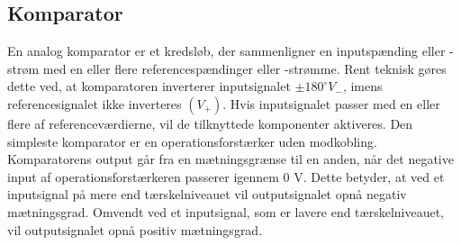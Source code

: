 \subsection{Komparator}\label{Komparatorafsnit}
En analog komparator er et kredsløb, der sammenligner en inputspænding eller -strøm med en eller flere referencespændinger eller -strømme. Rent teknisk gøres dette ved, at komparatoren inverterer inputsignalet $\pm 180^{\circ} V_{-}$, imens referencesignalet ikke inverteres $(V_{+})$. Hvis inputsignalet passer med en eller flere af referenceværdierne, vil de tilknyttede komponenter aktiveres. Den simpleste komparator er en operationsforstærker uden modkobling. \cite{webster2009} \\
Komparatorens output går fra en mætningsgrænse til en anden, når det negative input af operationsforstærkeren passerer igennem 0 V. Dette betyder, at ved et inputsignal på mere end tærskelniveauet vil outputsignalet opnå negativ mætningsgrad. Omvendt ved et inputsignal, som er lavere end tærskelniveauet, vil outputsignalet opnå positiv mætningsgrad. \cite{webster2009} 

